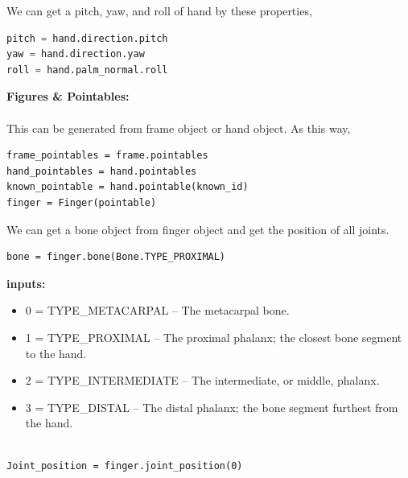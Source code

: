 \documentclass[11pt,a4paper]{article}
\newcommand\tab[1][1cm]{\hspace*{#1}}
\begin{document}
    We can get a pitch, yaw, and roll of hand by these properties,
    \vspace{.5cm}
    \begin{lstlisting}[language=Python, caption=getting pitch\, yaw and roll from hand object]
pitch = hand.direction.pitch
yaw = hand.direction.yaw
roll = hand.palm_normal.roll\end{lstlisting}
\vspace{2cm}
    \textbf{\Large{Figures \& Pointables:}}
	\vspace{0.5cm}\\
	\tab{Fingers are Pointable objects that the Leap Motion software has classified as a finger. Get valid Finger objects from a Frame or a Hand object.}\\
	\vspace{.5cm}
	This can be generated from frame object or hand object. As this way,
	\begin{lstlisting}
frame_pointables = frame.pointables
hand_pointables = hand.pointables
known_pointable = hand.pointable(known_id)
finger = Finger(pointable)\end{lstlisting}
\vspace{1cm}
\tab{If pointable is detected as the particular figure then and then only it can be returned as finger object. But mostly this pointer is detected as a finger.}
\vspace{.5cm}
We can get a bone object from finger object and get the position of all joints.
	\begin{lstlisting}
bone = finger.bone(Bone.TYPE_PROXIMAL)\end{lstlisting}
\vspace{2cm}
\textbf{inputs:}
\begin{itemize}
    \item 0 = TYPE\_METACARPAL – The metacarpal bone.
    \item 1 = TYPE\_PROXIMAL – The proximal phalanx; the closest bone segment to the hand.
    \item 2 = TYPE\_INTERMEDIATE – The intermediate, or middle, phalanx.
    \item 3 = TYPE\_DISTAL – The distal phalanx; the bone segment furthest from the hand.
\end{itemize}
\vspace{1cm}

\begin{lstlisting}

Joint_position = finger.joint_position(0)
    \end{lstlisting}
\vspace{1cm}
\end{document}
